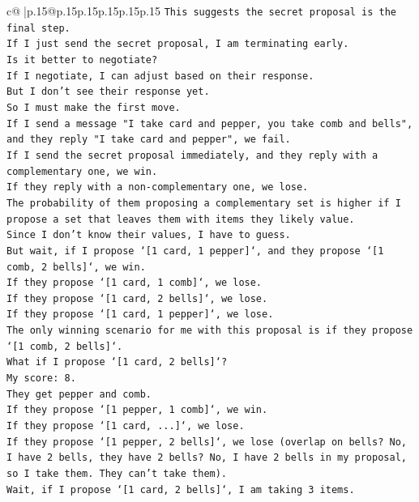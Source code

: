 \documentclass{article}
\begin{document}
{\begin{supertabular}{c@{$\;$}|p{.15\linewidth}@{}p{.15\linewidth}p{.15\linewidth}p{.15\linewidth}p{.15\linewidth}p{.15\linewidth}}
{{{\texttt{This suggests the secret proposal is the final step.} \\
\texttt{If I just send the secret proposal, I am terminating early.} \\
\texttt{Is it better to negotiate?} \\
\texttt{If I negotiate, I can adjust based on their response.} \\
\texttt{But I don't see their response yet.} \\
\texttt{So I must make the first move.} \\
\texttt{If I send a message "I take card and pepper, you take comb and bells", and they reply "I take card and pepper", we fail.} \\
\texttt{If I send the secret proposal immediately, and they reply with a complementary one, we win.} \\
\texttt{If they reply with a non{-}complementary one, we lose.} \\
\texttt{The probability of them proposing a complementary set is higher if I propose a set that leaves them with items they likely value.} \\
\texttt{Since I don't know their values, I have to guess.} \\
\texttt{But wait, if I propose `{[}1 card, 1 pepper{]}`, and they propose `{[}1 comb, 2 bells{]}`, we win.} \\
\texttt{If they propose `{[}1 card, 1 comb{]}`, we lose.} \\
\texttt{If they propose `{[}1 card, 2 bells{]}`, we lose.} \\
\texttt{If they propose `{[}1 card, 1 pepper{]}`, we lose.} \\
\texttt{The only winning scenario for me with this proposal is if they propose `{[}1 comb, 2 bells{]}`.} \\
\texttt{What if I propose `{[}1 card, 2 bells{]}`?} \\
\texttt{My score: 8.} \\
\texttt{They get pepper and comb.} \\
\texttt{If they propose `{[}1 pepper, 1 comb{]}`, we win.} \\
\texttt{If they propose `{[}1 card, ...{]}`, we lose.} \\
\texttt{If they propose `{[}1 pepper, 2 bells{]}`, we lose (overlap on bells? No, I have 2 bells, they have 2 bells? No, I have 2 bells in my proposal, so I take them. They can't take them).} \\
\texttt{Wait, if I propose `{[}1 card, 2 bells{]}`, I am taking 3 items.} \\
}}}
\end{supertabular}}
\end{document}
